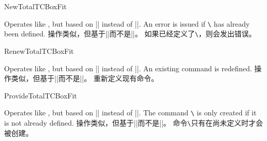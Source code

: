\begin{docCommand}{NewTotalTCBoxFit}{}
\begin{stripedbox}
Operates like , but based on |\NewDocumentCommand| instead of |\DeclareDocumentCommand|.
An error is issued if \texttt{\textbackslash} has already been defined.
\tcblower
操作类似，但基于|\NewDocumentCommand|而不是|\DeclareDocumentCommand|。
如果已经定义了\texttt{\textbackslash}，则会发出错误。
\end{stripedbox}
\end{docCommand}


\begin{docCommand}{RenewTotalTCBoxFit}{}
\begin{stripedbox}
Operates like , but based on |\RenewDocumentCommand| instead of |\DeclareDocumentCommand|.
An existing command is redefined.
\tcblower
操作类似，但基于|\RenewDocumentCommand|而不是|\DeclareDocumentCommand|。
重新定义现有命令。
\end{stripedbox}
\end{docCommand}

\begin{docCommand}{ProvideTotalTCBoxFit}{}
\begin{stripedbox}
Operates like , but based on |\ProvideDocumentCommand| instead of |\DeclareDocumentCommand|.
The command \texttt{\textbackslash} is only created if it is not already defined.
\tcblower
操作类似，但基于|\ProvideDocumentCommand|而不是|\DeclareDocumentCommand|。
命令\texttt{\textbackslash}只有在尚未定义时才会被创建。
\end{stripedbox}
\end{docCommand}